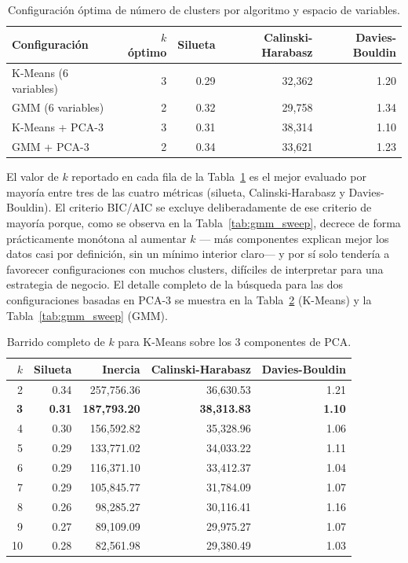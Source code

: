 \documentclass[11pt,letterpaper]{article}
\begin{document}
\begin{table}[h!]
\centering
\small
\caption{Configuración óptima de número de clusters por algoritmo y espacio de variables.}
\label{tab:clustering}
\begin{tabular}{@{}lrrrr@{}}
\toprule
Configuración & $k$ óptimo & Silueta & Calinski-Harabasz & Davies-Bouldin \\
\midrule
K-Means (6 variables) & 3 & 0.29 & 32{,}362 & 1.20 \\
GMM (6 variables) & 2 & 0.32 & 29{,}758 & 1.34 \\
K-Means + PCA-3 & 3 & 0.31 & 38{,}314 & 1.10 \\
GMM + PCA-3 & 2 & 0.34 & 33{,}621 & 1.23 \\
\bottomrule
\end{tabular}
\end{table}

El valor de $k$ reportado en cada fila de la Tabla~\ref{tab:clustering} es el mejor evaluado por mayoría entre tres de las cuatro métricas (silueta, Calinski-Harabasz y Davies-Bouldin). El criterio BIC/AIC se excluye deliberadamente de ese criterio de mayoría porque, como se observa en la Tabla~\ref{tab:gmm_sweep}, decrece de forma prácticamente monótona al aumentar $k$ --- más componentes explican mejor los datos casi por definición, sin un mínimo interior claro--- y por sí solo tendería a favorecer configuraciones con muchos clusters, difíciles de interpretar para una estrategia de negocio. El detalle completo de la búsqueda para las dos configuraciones basadas en PCA-3 se muestra en la Tabla~\ref{tab:kmeans_sweep} (K-Means) y la Tabla~\ref{tab:gmm_sweep} (GMM).

\begin{table}[h!]
\centering
\small
\caption{Barrido completo de $k$ para K-Means sobre los 3 componentes de PCA.}
\label{tab:kmeans_sweep}
\begin{tabular}{@{}rrrrr@{}}
\toprule
$k$ & Silueta & Inercia & Calinski-Harabasz & Davies-Bouldin \\
\midrule
2  & 0.34 & 257{,}756.36 & 36{,}630.53 & 1.21 \\
\textbf{3}  & \textbf{0.31} & \textbf{187{,}793.20} & \textbf{38{,}313.83} & \textbf{1.10} \\
4  & 0.30 & 156{,}592.82 & 35{,}328.96 & 1.06 \\
5  & 0.29 & 133{,}771.02 & 34{,}033.22 & 1.11 \\
6  & 0.29 & 116{,}371.10 & 33{,}412.37 & 1.04 \\
7  & 0.29 & 105{,}845.77 & 31{,}784.09 & 1.07 \\
8  & 0.26 & 98{,}285.27  & 30{,}116.41 & 1.16 \\
9  & 0.27 & 89{,}109.09  & 29{,}975.27 & 1.07 \\
10 & 0.28 & 82{,}561.98  & 29{,}380.49 & 1.03 \\
\bottomrule
\end{tabular}
\end{table}
\end{document}
